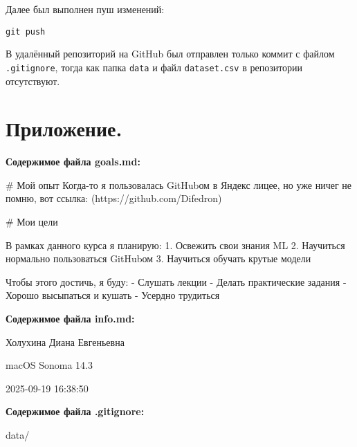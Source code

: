 \documentclass[12pt]{article}
\begin{document}
Далее был выполнен пуш изменений:
\begin{lstlisting}
git push
\end{lstlisting}

В удалённый репозиторий на GitHub был отправлен только коммит с файлом
\texttt{.gitignore}, тогда как папка \texttt{data} и файл \texttt{dataset.csv}
в репозитории отсутствуют.


\newpage

\section*{Приложение.}
\textbf{Содержимое файла goals.md:}

# Мой опыт
Когда-то я пользовалась GitHubом в Яндекс лицее, но уже ничег не помню, вот ссылка:
(https://github.com/Difedron)


# Мои цели

В рамках данного курса я планирую:
1. Освежить свои знания ML
2. Научиться нормально пользоваться GitHubом
3. Научиться обучать крутые модели

Чтобы этого достичь, я буду:
- Слушать лекции
- Делать практические задания
- Хорошо высыпаться и кушать
- Усердно трудиться



\textbf{Содержимое файла info.md:}

Холухина Диана Евгеньевна

macOS Sonoma 14.3

2025-09-19 16:38:50


\textbf{Содержимое файла .gitignore:}
\par

data/
\end{document}
